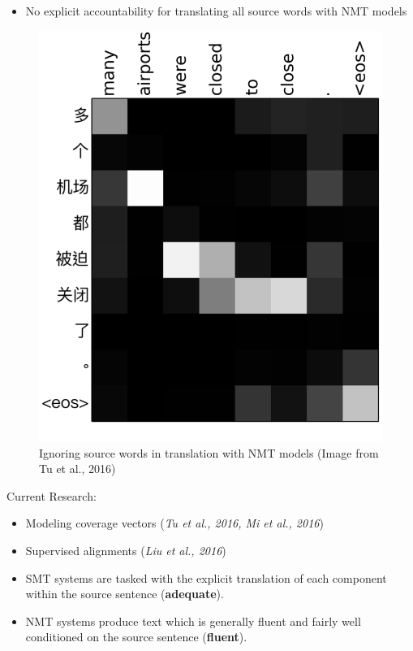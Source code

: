 \documentclass[landscape]{jhuslides3C}
\begin{document}
\begin{itemize}
\item No explicit accountability for translating all source words with NMT models
\end{itemize}
\begin{figure}
\begin{center}
\includegraphics[scale=0.2]{images/coverage.png}
\caption{Ignoring source words in translation with NMT models ({\tiny Image from Tu et al., 2016})}
\end{center}
\end{figure}
Current Research: 
\begin{itemize}
\item Modeling coverage vectors (\textit{Tu et al., 2016, Mi et al., 2016})
\item Supervised alignments (\textit{Liu et al., 2016})
\end{itemize}

\begin{itemize}
\item SMT systems are tasked with the explicit translation of each component within the source sentence (\textbf{adequate}).
\item NMT systems produce text which is generally fluent and fairly well conditioned on the source sentence (\textbf{fluent}).
\end{itemize}
\end{document}
